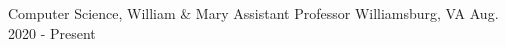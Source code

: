 \begin{cventries}

  \vspace{0.1cm}

  \cventry
    {Computer Science, William \& Mary}
    {Assistant Professor}
    {Williamsburg, VA}
    {Aug. 2020 - Present}
    {}
  
  \vspace{-0.5cm}
  
\end{cventries}